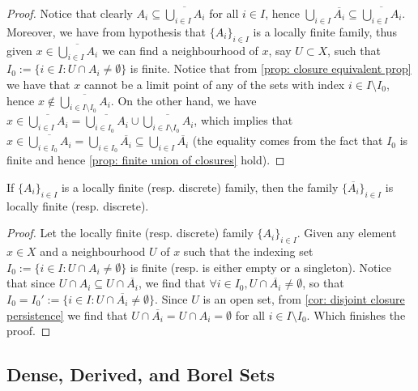 \begin{proof}
Notice that clearly \(A_i \subseteq \overline{\bigcup_{i \in  I} A_i}\) for
all \(i \in I\), hence \(\bigcup_{i \in  I} \overline{A_i} \subseteq
\overline{\bigcup_{i \in I} A_i}\). Moreover, we have from hypothesis that
\(\{A_i\}_{i \in I}\) is a locally finite family, thus given \(x \in
\overline{\bigcup_{i \in  I} A_i}\) we can find a neighbourhood of \(x\), say
\(U \subset X\), such that \(I_0 := \{i \in I : U \cap A_i \neq \emptyset\}\)
is finite. Notice that from \cref{prop: closure equivalent prop} we have that
\(x\) cannot be a limit point of any of the sets with index \(i \in I
\setminus I_0\), hence \(x \not\in \overline{\bigcup_{i \in  I \setminus I_0}
A_i}\). On the other hand, we have \(x \in \overline{\bigcup_{i \in  I} A_i} =
\overline{\bigcup_{i \in  I_0} A_i} \cup \overline{\bigcup_{i \in  I \setminus
I_0} A_i}\), which implies that \(x \in \overline{\bigcup_{i \in  I_0} A_i} =
\bigcup_{i \in  I_0} \overline{A_i} \subseteq \bigcup_{i \in  I}
\overline{A_i}\) (the equality comes from the fact that \(I_0\) is finite and
hence \cref{prop: finite union of closures} hold).
\end{proof}

\begin{proposition}
If \(\{A_i\}_{i \in I}\) is a locally finite (resp. discrete) family, then the
family \(\{\overline{A_i}\}_{i \in I}\) is locally finite (resp. discrete).
\end{proposition}

\begin{proof}
Let the locally finite (resp. discrete) family \(\{A_i\}_{i \in I}\). Given
any element \(x \in X\) and a neighbourhood \(U\) of \(x\) such that the
indexing set \(I_0 := \{i \in I: U \cap A_i \neq \emptyset\}\) is finite
(resp. is either empty or a singleton). Notice that since \(U \cap A_i
\subseteq U \cap \overline{A_i}\), we find that \(\forall i \in I_0, U \cap
\overline{A_i} \neq \emptyset\), so that \(I_0 = I_0' := \{i \in I: U \cap
\overline{A_i} \neq \emptyset\}\). Since \(U\) is an open set, from \cref{cor:
disjoint closure persistence} we find that \(U \cap \overline{A_i} = U \cap
A_i = \emptyset\) for all \(i \in I \setminus I_0\). Which finishes the proof.
\end{proof}

\subsection{Dense, Derived, and Borel Sets}

